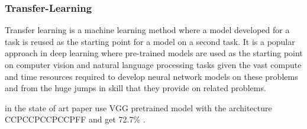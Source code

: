 \subsubsection{Transfer-Learning}
\label{sec:transferlearning}
Transfer learning is a machine learning method where a model developed for a task is reused as the starting point for a model on a second task.
It is a popular approach in deep learning where pre-trained models are used as the starting point on computer vision and natural language processing tasks given the vast compute and time resources required to develop neural network models on these problems and from the huge jumps in skill that they provide on related problems.

in the state of art paper use VGG pretrained model with the architecture CCPCCPCCPCCPFF and get 72.7\% .

